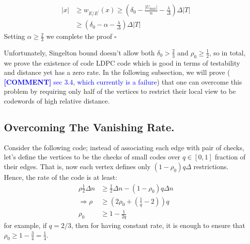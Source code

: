 \documentclass[sigplan,screen]{acmart}
\newcommand{\commentt}[1]{\textcolor{blue}{ \textbf{[COMMENT]} #1}}
\newcommand{\ctt}[1]{\commentt{#1}}
\begin{document}
\begin{multicols*}{2}
  \begin{equation*}
    \begin{split}
      |x| & \ge  w_{E/E^{\prime}}\left( x \right)  \ge \left( \delta_{0} - \frac{|U_{\max}|}{n} - \frac{\lambda}{\Delta} \right) \Delta|T| \\ 
      & \ge \left( \delta_{0} - \alpha - \frac{\lambda}{\Delta} \right) \Delta|T| 
    \end{split}
  \end{equation*}
  Setting $\alpha \ge \frac{2}{3}$ we complete the proof $\square$

  Unfortunately, Singelton bound doesn't allow both $\delta_0 > \frac{2}{3}$ and $\rho_0 \ge \frac{1}{2}$, so in total, we prove the existence of code LDPC code which is good in terms of testability and distance yet has a zero rate. In the following subsection, we will prove (\ctt{sec 3.4, which currently is a failure}) that one can overcome this problem by requiring only half of the vertices to restrict their local view to be codewords of high relative distance. 


  \subsection { Overcoming The Vanishing Rate. } 
  Consider the following code; instead of associating each edge with pair of checks, let's define the vertices to be the checks of small codes over $q \in [0,1]$ fraction of their edges. That is, now each vertex defines only $\left( 1 - \rho_{0} \right)q\Delta$ restrictions. Hence, the rate of the code is at least:   
  \begin{equation*}
    \begin{split}
      \rho\frac{1}{2}\Delta n & \ge \frac{1}{2}\Delta n - \left(1 - \rho_{0} \right)q\Delta n \\
      \Rightarrow \rho & \ge \left(  2\rho_{0} + \left( \frac{1}{q}  - 2  \right)  \right)q \\ 
      \rho_{0} & \ge  1 - \frac{1}{2q} 
    \end{split}
  \end{equation*} for example, if $q = 2/3$, then for having constant rate, it is enough to ensure that $ \rho_{0} \ge 1 - \frac{3}{4} = \frac{1}{4}$.


\end{multicols*}
\end{document}
